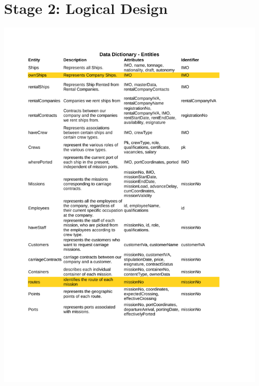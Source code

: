\documentclass[10pt]{report}
\begin{document}
\chapter*{Stage 2: Logical Design}
\begin{center}
	\includegraphics[trim=0cm 4cm 0cm 0cm,clip=true,height=.85\textheight, width=\textwidth]{DataDictionary.pdf}
\end{center}
\newpage
\end{document}
